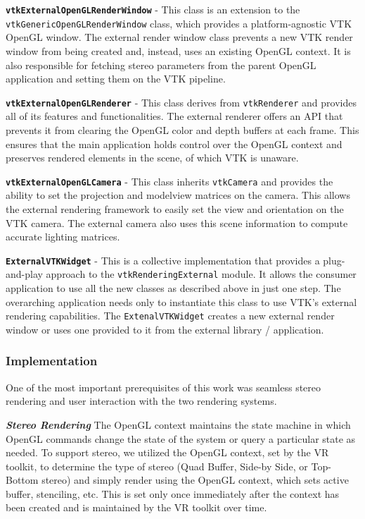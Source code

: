 \textbf{\texttt{vtkExternalOpenGLRenderWindow}} - This class is an extension to
the \texttt{vtkGenericOpenGLRenderWindow} class, which provides a
platform-agnostic VTK OpenGL window.
The external render window class prevents a new VTK render window from being
created and, instead, uses an existing OpenGL context.
It is also responsible for fetching stereo parameters from the parent OpenGL
application and setting them on the VTK pipeline.

\textbf{\texttt{vtkExternalOpenGLRenderer}} - This class derives from
\texttt{vtkRenderer} and provides all of its features and functionalities. The
external renderer offers an API that prevents it from clearing the OpenGL color
and depth buffers at each frame. This ensures that the main application holds
control over the OpenGL context and preserves rendered elements in the scene, of
which VTK is unaware.

\textbf{\texttt{vtkExternalOpenGLCamera}} - This class inherits
\texttt{vtkCamera} and provides the ability to set the projection and modelview
matrices on the camera. This allows the external rendering framework to easily
set the view and orientation on the VTK camera. The external camera also uses
this scene information to compute accurate lighting matrices.

\textbf{\texttt{ExternalVTKWidget}} - This is a collective implementation that
provides a plug-and-play approach to the \texttt{vtkRenderingExternal} module.
It allows the consumer application to use all the new classes as described above
in just one step. The overarching application needs only to instantiate this
class to use VTK's external rendering capabilities. The
\texttt{ExtenalVTKWidget} creates a new external render window or uses one
provided to it from the external library / application.

\subsubsection{Implementation}

One of the most important prerequisites of this work was seamless stereo rendering and user interaction with the two rendering systems. 

\textbf{\textit{Stereo Rendering}} The OpenGL context maintains the state machine in which OpenGL commands change the state of the system or query a particular state as needed.
To support stereo, we utilized the OpenGL context, set by the VR toolkit, to determine the type of stereo (Quad Buffer, Side-by Side, or Top-Bottom stereo) and simply render using the OpenGL context, which sets active buffer, stenciling, etc.
This is set only once immediately after the context has been created and is maintained by the VR toolkit over time. 

